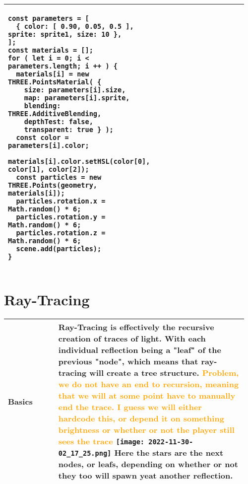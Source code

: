 \documentclass[main.tex,fontsize=8pt,paper=a4,paper=portrait,DIV=calc,]{scrartcl}
\begin{document}
\begin{table}[ht!]
\begin{tabular}{|m{0.2\linewidth}|m{0.755\linewidth}|}
\begin{lstlisting}
const parameters = [
  { color: [ 0.90, 0.05, 0.5 ], sprite: sprite1, size: 10 },
];
const materials = [];
for ( let i = 0; i < parameters.length; i ++ ) {
  materials[i] = new THREE.PointsMaterial( {
    size: parameters[i].size,
    map: parameters[i].sprite,
    blending: THREE.AdditiveBlending,
    depthTest: false,
    transparent: true } );
  const color = parameters[i].color;
  materials[i].color.setHSL(color[0], color[1], color[2]);
  const particles = new THREE.Points(geometry, materials[i]);
  particles.rotation.x = Math.random() * 6;
  particles.rotation.y = Math.random() * 6;
  particles.rotation.z = Math.random() * 6;
  scene.add(particles);
}
\end{lstlisting}\\
\hline
\end{tabular}
\end{table}
\pagebreak
\begin{table}[ht!]
\section{Ray-Tracing}
\begin{tabular}{|m{0.2\linewidth}|m{0.755\linewidth}|}
\hline
Basics & 
Ray-Tracing is effectively the recursive creation of traces of light. With each individual reflection being a "leaf" of the previous "node", which means that ray-tracing will create a tree structure.\newline
\textcolor{orange}{Problem, we do not have an end to recursion, meaning that we will at some point have to manually end the trace.\newline
I guess we will either hardcode this, or depend it on something brightness or whether or not the player still sees the trace}\newline
\texttt{[image: 2022-11-30-02\_17\_25.png]}\newline
Here the stars are the next nodes, or leafs, depending on whether or not they too will spawn yeat another reflection.\\
\hline

\hline

\hline

\hline

\hline

\hline

\hline

\hline

\hline

\hline
\end{tabular}
\end{table}
\end{document}
